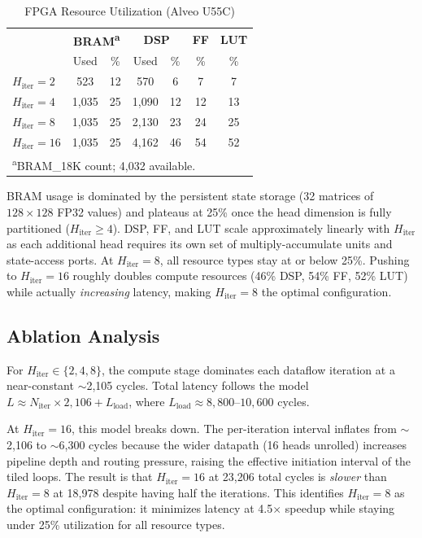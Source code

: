 \documentclass[conference]{IEEEtran}
\begin{document}
\begin{table}[t]
\centering
\caption{FPGA Resource Utilization (Alveo U55C)}
\label{tab:resources}
\begin{tabular}{lcccccc}
\toprule
& \multicolumn{2}{c}{\textbf{BRAM\textsuperscript{a}}} & \multicolumn{2}{c}{\textbf{DSP}} & \textbf{FF} & \textbf{LUT} \\
& Used & \% & Used & \% & \% & \% \\
\midrule
$H_{\mathrm{iter}}{=}2$ & 523 & 12 & 570 & 6 & 7 & 7 \\
$H_{\mathrm{iter}}{=}4$ & 1{,}035 & 25 & 1{,}090 & 12 & 12 & 13 \\
$H_{\mathrm{iter}}{=}8$ & 1{,}035 & 25 & 2{,}130 & 23 & 24 & 25 \\
$H_{\mathrm{iter}}{=}16$ & 1{,}035 & 25 & 4{,}162 & 46 & 54 & 52 \\
\bottomrule
\multicolumn{7}{l}{\footnotesize \textsuperscript{a}BRAM\_18K count; 4{,}032 available.}
\end{tabular}
\end{table}

BRAM usage is dominated by the persistent state storage (32 matrices of
$128 \times 128$ FP32 values) and plateaus at 25\% once the head dimension is
fully partitioned ($H_{\mathrm{iter}} \geq 4$). DSP, FF, and LUT scale
approximately linearly with $H_{\mathrm{iter}}$ as each additional head
requires its own set of multiply-accumulate units and state-access ports.
At $H_{\mathrm{iter}}{=}8$, all resource types stay at or below 25\%.
Pushing to $H_{\mathrm{iter}}{=}16$ roughly doubles compute resources
(46\% DSP, 54\% FF, 52\% LUT) while actually \emph{increasing} latency,
making $H_{\mathrm{iter}}{=}8$ the optimal configuration.

\subsection{Ablation Analysis}
\label{sec:ablation}

For $H_{\mathrm{iter}} \in \{2, 4, 8\}$, the compute stage dominates
each dataflow iteration at a near-constant $\sim$2{,}105 cycles.
Total latency follows the model
$L \approx N_{\mathrm{iter}} \times 2{,}106 + L_{\mathrm{load}}$,
where $L_{\mathrm{load}} \approx 8{,}800$--$10{,}600$ cycles.

At $H_{\mathrm{iter}}{=}16$, this model breaks down. The per-iteration
interval inflates from $\sim$2{,}106 to $\sim$6{,}300 cycles because
the wider datapath (16 heads unrolled) increases pipeline depth and
routing pressure, raising the effective initiation interval of the
tiled loops. The result is that $H_{\mathrm{iter}}{=}16$ at 23{,}206
total cycles is \emph{slower} than $H_{\mathrm{iter}}{=}8$ at 18{,}978
despite having half the iterations. This identifies
$H_{\mathrm{iter}}{=}8$ as the optimal configuration: it
minimizes latency at 4.5$\times$ speedup while staying under 25\%
utilization for all resource types.
\end{document}
